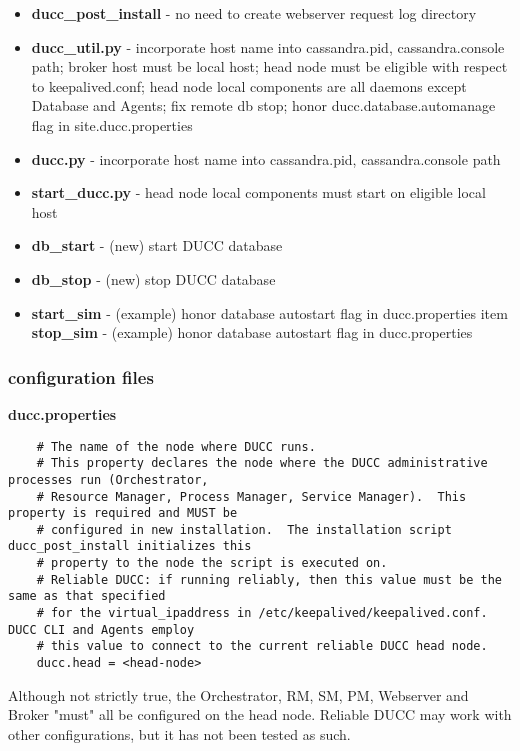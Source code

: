 \documentclass[letterpaper]{article}
\begin{document}
{\renewcommand\labelitemi{}
\begin{itemize}
  \item \textbf{ducc\_post\_install} - no need to create webserver request log directory
  \item \textbf{ducc\_util.py} - incorporate host name into cassandra.pid, cassandra.console path; broker host must be local host; head node must be eligible with respect to keepalived.conf; head node local components are all daemons except Database and Agents; fix remote db stop; honor ducc.database.automanage flag in site.ducc.properties
  \item \textbf{ducc.py} - incorporate host name into cassandra.pid, cassandra.console path
  \item \textbf{start\_ducc.py} - head node local components must start on eligible local host
  \item \textbf{db\_start} - (new) start DUCC database
  \item \textbf{db\_stop} - (new) stop DUCC database
  \item \textbf{start\_sim} - (example) honor database autostart flag in ducc.properties
  item \textbf{stop\_sim} - (example) honor database autostart flag in ducc.properties
\end{itemize}
}

\subsubsection{configuration files}

\textbf{ducc.properties}  

   \begin{verbatim}
    # The name of the node where DUCC runs.
    # This property declares the node where the DUCC administrative processes run (Orchestrator,
    # Resource Manager, Process Manager, Service Manager).  This property is required and MUST be
    # configured in new installation.  The installation script ducc_post_install initializes this 
    # property to the node the script is executed on.
    # Reliable DUCC: if running reliably, then this value must be the same as that specified
    # for the virtual_ipaddress in /etc/keepalived/keepalived.conf.  DUCC CLI and Agents employ
    # this value to connect to the current reliable DUCC head node.
    ducc.head = <head-node>
   \end{verbatim}

Although not strictly true, the Orchestrator, RM, SM, PM, Webserver and Broker "must"
all be configured on the head node.  Reliable DUCC may work with other configurations,
but it has not been tested as such.
\end{document}
